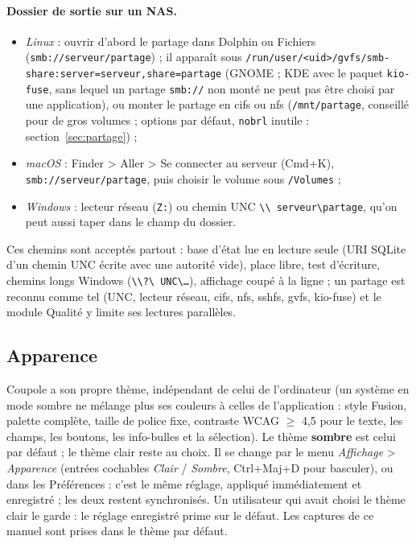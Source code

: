 \paragraph{Dossier de sortie sur un NAS.}
\begin{itemize}[nosep]
\item \emph{Linux} : ouvrir d'abord le partage dans Dolphin ou Fichiers (\texttt{smb://serveur/partage}) ; il apparaît
  sous \texttt{/run/user/<uid>/gvfs/smb-share:server=serveur,share=partage} (GNOME ; KDE avec le paquet
  \texttt{kio-fuse}, sans lequel un partage \texttt{smb://} non monté ne peut pas être choisi par une application),
  ou monter le partage en cifs ou nfs (\texttt{/mnt/partage}, conseillé pour de gros volumes ; options par défaut, \texttt{nobrl} inutile : section~\ref{sec:partage}) ;
\item \emph{macOS} : Finder > Aller > Se connecter au serveur (Cmd+K), \texttt{smb://serveur/partage}, puis choisir le
  volume sous \texttt{/Volumes} ;
\item \emph{Windows} : lecteur réseau (\texttt{Z:}) ou chemin UNC \texttt{\textbackslash\textbackslash
  serveur\textbackslash partage}, qu'on peut aussi taper dans le champ du dossier.
\end{itemize}
Ces chemins sont acceptés partout : base d'état lue en lecture seule (URI SQLite d'un chemin UNC écrite avec une
autorité vide), place libre, test d'écriture, chemins longs Windows (\texttt{\textbackslash\textbackslash?\textbackslash
UNC\textbackslash…}), affichage coupé à la ligne ; un partage est reconnu comme tel (UNC, lecteur réseau, cifs, nfs,
sshfs, gvfs, kio-fuse) et le module Qualité y limite ses lectures parallèles.

\subsection{Apparence}\label{sec:apparence}
Coupole a son propre thème, indépendant de celui de l'ordinateur (un système en mode sombre ne mélange plus ses
couleurs à celles de l'application : style Fusion, palette complète, taille de police fixe, contraste WCAG $\geq$ 4,5
pour le texte, les champs, les boutons, les info-bulles et la sélection). Le thème \textbf{sombre} est celui par défaut ;
le thème clair reste au choix. Il se change par le menu \emph{Affichage} > \emph{Apparence} (entrées cochables
\emph{Clair} / \emph{Sombre}, Ctrl+Maj+D pour basculer), ou dans les Préférences : c'est le même réglage, appliqué
immédiatement et enregistré ; les deux restent synchronisés. Un utilisateur qui avait choisi le thème clair le garde :
le réglage enregistré prime sur le défaut. Les captures de ce manuel sont prises dans le thème par défaut.

